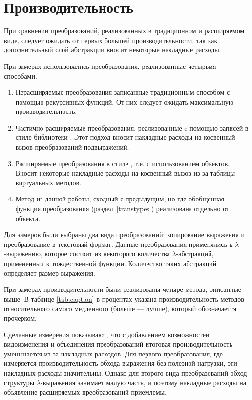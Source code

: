 \section{Производительность}
\label{sec:performance}

При сравнении преобразований, реализованных в традиционном и расширяемом виде,
следует ожидать от первых большей производительности, так как дополнительный слой абстракции вносит некоторые накладные расходы.

При замерах использовались преобразования, реализованные четырьмя способами.
\begin{enumerate}
\item Нерасширяемые преобразования записанные традиционным способом с помощью рекурсивных функций. От них следует ожидать максимальную производительность.
\item Частично расширяемые преобразования, реализованные c помощью записей в стиле библиотеки . Этот  подход вносит накладные расходы на косвенный вызов преобразований подвыражений.%
\item Расширяемые преобразования в стиле \visitors{}, т.е. с использованием объектов. Вносит некоторые накладные расходы на косвенный вызов из-за таблицы виртуальных методов.
\item Метод из данной работы, сходный с предыдущим, но где обобщенная функция преобразования (раздел~\ref{transtypes}) реализована отдельно от объекта.
\end{enumerate}

Для замеров были выбраны два вида преобразований: копирование выражения и преобразование в текстовый формат.
Данные преобразования применялись к $\lambda$-выражению, которое состоит из некоторого количества $\lambda$-абстракций,  примененных к тождественной функции. Количество таких абстракций определяет размер выражения.

При замерах производительности были реализованы четыре метода, описанные выше. В таблице \ref{tab:caption} в процентах указана производительность методов относительного самого медленного (больше --- лучше), который обозначается прочерком.

Сделанные измерения показывают, что с добавлением возможностей видоизменения и объединения преобразований итоговая производительность уменьшается из-за накладных расходов. Для первого  преобразования, где измеряется производительность обхода выражения без полезной нагрузки,
эти накладных расходы значительны. Однако для второго вида преобразований обход структуры $\lambda$-выражения занимает малую часть, и поэтому накладные расходы на объявление расширяемых преобразований приемлемы.


